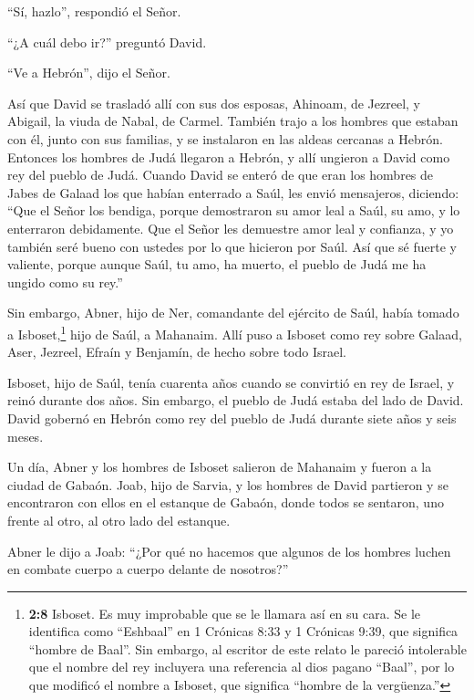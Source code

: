 ``Sí, hazlo'', respondió el Señor.

``¿A cuál debo ir?'' preguntó David.

``Ve a Hebrón'', dijo el Señor.

 Así que David se trasladó allí con sus dos esposas,
Ahinoam, de Jezreel, y Abigail, la viuda de Nabal, de Carmel.
 También trajo a los hombres que estaban con él, junto con
sus familias, y se instalaron en las aldeas cercanas a Hebrón.
 Entonces los hombres de Judá llegaron a Hebrón, y allí
ungieron a David como rey del pueblo de Judá. Cuando David se enteró de
que eran los hombres de Jabes de Galaad los que habían enterrado a Saúl,
 les envió mensajeros, diciendo: ``Que el Señor los bendiga,
porque demostraron su amor leal a Saúl, su amo, y lo enterraron
debidamente.  Que el Señor les demuestre amor leal y
confianza, y yo también seré bueno con ustedes por lo que hicieron por
Saúl.  Así que sé fuerte y valiente, porque aunque Saúl, tu
amo, ha muerto, el pueblo de Judá me ha ungido como su rey.''

 Sin embargo, Abner, hijo de Ner, comandante del ejército de
Saúl, había tomado a Isboset,\footnote{\textbf{2:8} Isboset. Es muy
  improbable que se le llamara así en su cara. Se le identifica como
  ``Eshbaal'' en 1 Crónicas 8:33 y 1 Crónicas 9:39, que significa
  ``hombre de Baal''. Sin embargo, al escritor de este relato le pareció
  intolerable que el nombre del rey incluyera una referencia al dios
  pagano ``Baal'', por lo que modificó el nombre a Isboset, que
  significa ``hombre de la vergüenza.''} hijo de Saúl, a Mahanaim.
 Allí puso a Isboset como rey sobre Galaad, Aser, Jezreel,
Efraín y Benjamín, de hecho sobre todo Israel.

 Isboset, hijo de Saúl, tenía cuarenta años cuando se
convirtió en rey de Israel, y reinó durante dos años. Sin embargo, el
pueblo de Judá estaba del lado de David.  David gobernó en
Hebrón como rey del pueblo de Judá durante siete años y seis meses.

 Un día, Abner y los hombres de Isboset salieron de
Mahanaim y fueron a la ciudad de Gabaón.  Joab, hijo de
Sarvia, y los hombres de David partieron y se encontraron con ellos en
el estanque de Gabaón, donde todos se sentaron, uno frente al otro, al
otro lado del estanque.

 Abner le dijo a Joab: ``¿Por qué no hacemos que algunos de
los hombres luchen en combate cuerpo a cuerpo delante de nosotros?''

